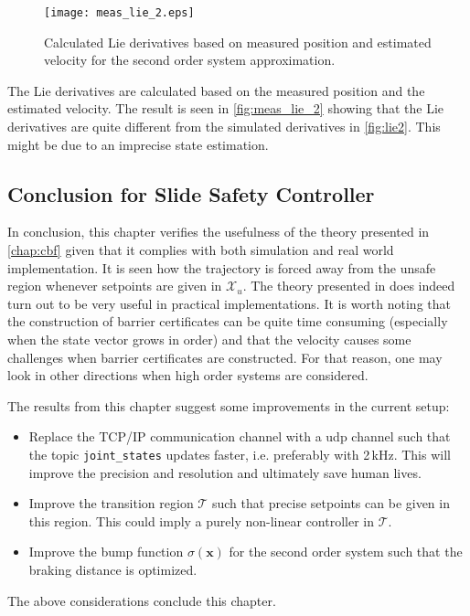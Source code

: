 \begin{figure}[H]
	\center
		\texttt{[image: meas\_lie\_2.eps]}
	\caption{Calculated Lie derivatives based on measured position and estimated velocity for the second order system approximation. }
    \label{fig:meas_lie_2}
\end{figure}
The Lie derivatives are calculated based on the measured position and the estimated velocity. The result is seen in \autoref{fig:meas_lie_2} showing that the Lie derivatives  are quite different from the simulated derivatives in \autoref{fig:lie2}. This might be due to an imprecise state estimation.

\subsection{Conclusion for Slide Safety Controller}\label{subsec:conclusion-slide-safety}
In conclusion, this chapter verifies the usefulness of the theory presented in \autoref{chap:cbf} given that it complies with both simulation and real world implementation. It is seen how the trajectory is forced away from the unsafe region whenever setpoints are given in $\mathcal{X}_u$. The theory presented in \citep{bib:org_control} does indeed turn out to be very useful in practical implementations. It is worth noting that the construction of barrier certificates can be quite time consuming (especially when the state vector grows in order) and that the velocity causes some challenges when barrier certificates are constructed. For that reason, one may look in other directions when high order systems are considered.

The results from this chapter suggest some improvements in the current setup:
\begin{itemize}
\item Replace the TCP/IP communication channel with a \gls{udp} channel such that the topic \texttt{joint\_states} updates faster, i.e. preferably with 2\,kHz. This will  improve the precision and resolution and ultimately save human lives.
\item Improve the transition region $\mathcal{T}$ such that precise setpoints can be given in this region. This could imply a purely non-linear controller in $\mathcal{T}$.
\item Improve the bump function $\sigma(\mathbf{x})$ for the second order system such that the braking distance is optimized.
\end{itemize}
The above considerations conclude this chapter.